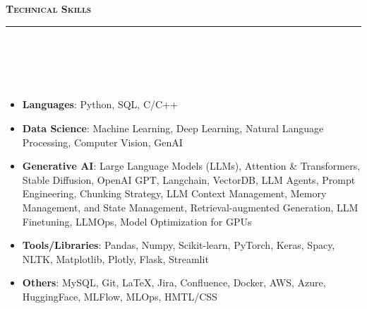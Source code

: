 \documentclass[a4paper,10pt]{article}
\newcommand{\lsep}{-0.5cm}
\newcommand{\resheading}[1]{{\small
        {
            \begin{minipage}
                {0.992\textwidth}\textbf{{\textsc{#1 \vphantom{p\^{E}} }}}
                \\[-0.3cm]
                \hrule
            \end{minipage}
            \\[-0.5cm]
        }
 }}
\begin{document}
\vspace{4pt}
\noindent
\resheading{\textbf{\large Technical Skills}}\\[\lsep] 
\\[-0.3cm]
\begin{itemize}
  \item \textbf{Languages}: Python, SQL, C/C++\\[-0.5cm]
  \item \textbf{Data Science}: Machine Learning, Deep Learning, Natural Language Processing, Computer Vision, GenAI  \\[-0.5cm]
  \item \textbf{Generative AI}: Large Language Models (LLMs), Attention \& Transformers, Stable Diffusion, OpenAI GPT, Langchain, VectorDB, LLM Agents, Prompt Engineering, Chunking Strategy, LLM Context Management, Memory Management, and State Management, Retrieval-augmented Generation, LLM Finetuning, LLMOps, Model Optimization for GPUs \\[-0.5cm]
  \item \textbf{Tools/Libraries}: Pandas, Numpy, Scikit-learn, PyTorch, Keras, Spacy, NLTK, Matplotlib, Plotly, Flask, Streamlit \\[-0.5cm]
  \item \textbf{Others}: MySQL, Git, LaTeX, Jira, Confluence, Docker, AWS, Azure, HuggingFace, MLFlow, MLOps, HMTL/CSS\\[-0.4cm]
\end{itemize}

\end{document}
